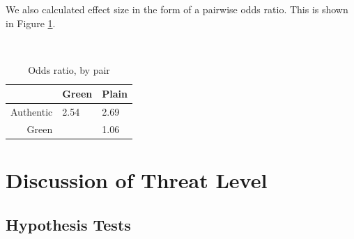 \documentclass[twoside,letterpaper]{soups}
\begin{document}
We also calculated effect size in the form of a pairwise odds ratio. This is shown in Figure \ref{fig:results:oddsratios}.

\begin{table}
\centering
\caption{Odds ratio, by pair}
\mbox{}\\
\begin{tabular}{|r|l|l|}
\hline
            & Green             & Plain \\
\hline
Authentic   & 2.54              & 2.69 \\
\hline
Green       & \cellcolor{gray}  & 1.06 \\
\hline
\end{tabular}
\label{fig:results:oddsratios}
\end{table}







\section{Discussion of Threat Level}


\subsection{Hypothesis Tests}
\end{document}
